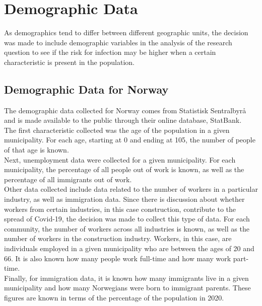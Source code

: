 \section{Demographic Data}
As demographics tend to differ between different geographic units, the decision was made to include demographic variables in the analysis of the research question to see if the risk for infection may be higher when a certain characteristic is present in the population.
\subsection{Demographic Data for Norway}
The demographic data collected for Norway comes from Statistisk Sentralbyrå and is made available to the public through their online database, StatBank\autocite[][]{ssb}. \\
The first characteristic collected was the age of the population in a given municipality. For each age, starting at 0 and ending at 105, the number of people of that age is known. \\
Next, unemployment data were collected for a given municipality. For each municipality, the percentage of all people out of work is known, as well as the percentage of all immigrants out of work. \\
Other data collected include data related to the number of workers in a particular industry, as well as immigration data. Since there is discussion about whether workers from certain industries, in this case construction, contribute to the spread of Covid-19, the decision was made to collect this type of data. For each community, the number of workers across all industries is known, as well as the number of workers in the construction industry. Workers, in this case, are individuals employed in a given municipality who are between the ages of 20 and 66. It is also known how many people work full-time and how many work part-time. \\
Finally, for immigration data, it is known how many immigrants live in a given municipality and how many Norwegians were born to immigrant parents. These figures are known in terms of the percentage of the population in 2020.
